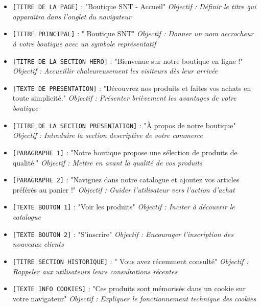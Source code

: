 \documentclass[12pt,a4paper]{article}
\begin{document}
\begin{itemize}
\item \texttt{[TITRE DE LA PAGE]} : "Boutique SNT - Accueil" \newline \textit{Objectif : Définir le titre qui apparaîtra dans l'onglet du navigateur}
\item \texttt{[TITRE PRINCIPAL]} : "\faShoppingCart{} Boutique SNT" \newline \textit{Objectif : Donner un nom accrocheur à votre boutique avec un symbole représentatif}
\item \texttt{[TITRE DE LA SECTION HERO]} : "Bienvenue sur notre boutique en ligne !" \newline \textit{Objectif : Accueillir chaleureusement les visiteurs dès leur arrivée}
\item \texttt{[TEXTE DE PRESENTATION]} : "Découvrez nos produits et faites vos achats en toute simplicité." \newline \textit{Objectif : Présenter brièvement les avantages de votre boutique}
\item \texttt{[TITRE DE LA SECTION PRESENTATION]} : "À propos de notre boutique" \newline \textit{Objectif : Introduire la section descriptive de votre commerce}
\item \texttt{[PARAGRAPHE 1]} : "Notre boutique propose une sélection de produits de qualité." \newline \textit{Objectif : Mettre en avant la qualité de vos produits}
\item \texttt{[PARAGRAPHE 2]} : "Naviguez dans notre catalogue et ajoutez vos articles préférés au panier !" \newline \textit{Objectif : Guider l'utilisateur vers l'action d'achat}
\item \texttt{[TEXTE BOUTON 1]} : "Voir les produits" \newline \textit{Objectif : Inciter à découvrir le catalogue}
\item \texttt{[TEXTE BOUTON 2]} : "S'inscrire" \newline \textit{Objectif : Encourager l'inscription des nouveaux clients}
\item \texttt{[TITRE SECTION HISTORIQUE]} : "\faClockO{} Vous avez récemment consulté" \newline \textit{Objectif : Rappeler aux utilisateurs leurs consultations récentes}
\item \texttt{[TEXTE INFO COOKIES]} : "Ces produits sont mémorisés dans un cookie sur votre navigateur" \newline \textit{Objectif : Expliquer le fonctionnement technique des cookies}

\end{itemize}
\end{document}
